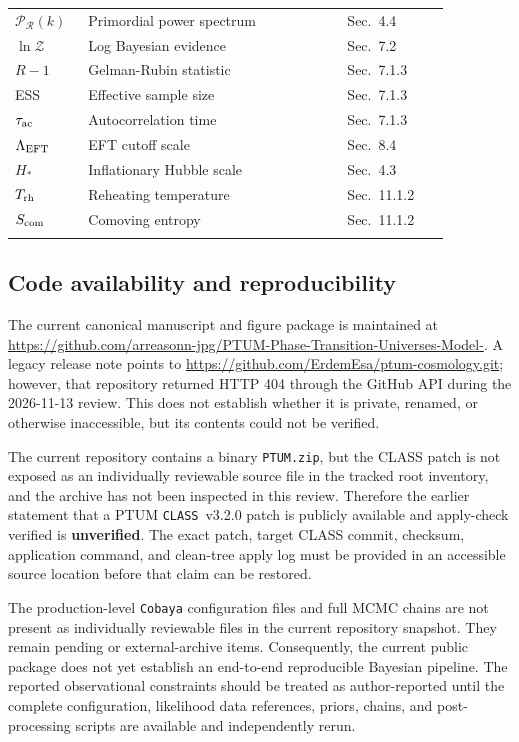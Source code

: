 \documentclass[epj]{svjour}
\begin{document}
\begin{table}[htbp]
\begin{tabular}{@{}>{\raggedright\arraybackslash}p{0.15\linewidth}>{\raggedright\arraybackslash}p{0.53\linewidth}>{\raggedright\arraybackslash}p{0.21\linewidth}@{}}
\(\mathcal{P}_{\mathcal{R}}(k)\) & Primordial power spectrum & Sec.~4.4 \\
\(\ln\mathcal{Z}\) & Log Bayesian evidence & Sec.~7.2 \\
\(R-1\) & Gelman-Rubin statistic & Sec.~7.1.3 \\
ESS & Effective sample size & Sec.~7.1.3 \\
\(\tau_{\rm ac}\) & Autocorrelation time & Sec.~7.1.3 \\
\(\Lambda_{\rm EFT}\) & EFT cutoff scale & Sec.~8.4 \\
\(H_*\) & Inflationary Hubble scale & Sec.~4.3 \\
\(T_{\rm rh}\) & Reheating temperature & Sec.~11.1.2 \\
\(S_{\rm com}\) & Comoving entropy & Sec.~11.1.2 \\
\noalign{\smallskip}\hline
\end{tabular}
\end{table}

\subsection{Code availability and reproducibility}
\label{app:code-availability}

The current canonical manuscript and figure package is maintained at
\url{https://github.com/arreasonn-jpg/PTUM-Phase-Transition-Universes-Model-}.
A legacy release note points to
\url{https://github.com/ErdemEsa/ptum-cosmology.git}; however, that
repository returned HTTP 404 through the GitHub API during the
2026-11-13 review. This does not establish whether it is private,
renamed, or otherwise inaccessible, but its contents could not be
verified.

The current repository contains a binary \texttt{PTUM.zip}, but the
CLASS patch is not exposed as an individually reviewable source file
in the tracked root inventory, and the archive has not been inspected
in this review. Therefore the earlier statement that a PTUM
\texttt{CLASS}~v3.2.0 patch is publicly available and apply-check
verified is \textbf{unverified}. The exact patch, target CLASS commit,
checksum, application command, and clean-tree apply log must be
provided in an accessible source location before that claim can be
restored.

The production-level \texttt{Cobaya} configuration files and full MCMC
chains are not present as individually reviewable files in the current
repository snapshot. They remain pending or external-archive items.
Consequently, the current public package does not yet establish an
end-to-end reproducible Bayesian pipeline. The reported observational
constraints should be treated as author-reported until the complete
configuration, likelihood data references, priors, chains, and
post-processing scripts are available and independently rerun.
\end{document}
